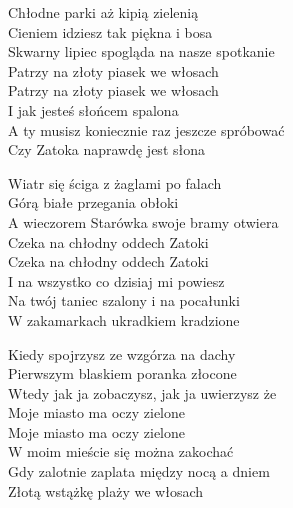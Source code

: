 \begin{text}
    Chłodne parki aż kipią zielenią\\
    Cieniem idziesz tak piękna i bosa\\
    Skwarny lipiec spogląda na nasze spotkanie\\
    Patrzy na złoty piasek we włosach\\
    Patrzy na złoty piasek we włosach\\
    I jak jesteś słońcem spalona\\
    A ty musisz koniecznie raz jeszcze spróbować\\
    Czy Zatoka naprawdę jest słona

    Wiatr się ściga z żaglami po falach\\
    Górą białe przegania obłoki\\
    A wieczorem Starówka swoje bramy otwiera\\
    Czeka na chłodny oddech Zatoki\\
    Czeka na chłodny oddech Zatoki\\
    I na wszystko co dzisiaj mi powiesz\\
    Na twój taniec szalony i na pocałunki\\
    W zakamarkach ukradkiem kradzione

    Kiedy spojrzysz ze wzgórza na dachy\\
    Pierwszym blaskiem poranka złocone\\
    Wtedy jak ja zobaczysz, jak ja uwierzysz że\\
    Moje miasto ma oczy zielone\\
    Moje miasto ma oczy zielone\\
    W moim mieście się można zakochać\\
    Gdy zalotnie zaplata między nocą a dniem\\
    Złotą wstążkę plaży we włosach
\end{text}
